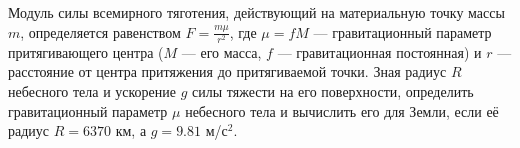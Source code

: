 Модуль силы всемирного тяготения, действующий на материальную точку
массы $m$, определяется равенством $F=\frac{m\mu}{r^2}$, где
$\mu=fM$ --- гравитационный параметр притягивающего центра ($M$ --- его
масса, $f$ --- гравитационная постоянная) и $r$ --- расстояние от центра
притяжения до притягиваемой точки. Зная радиус $R$ небесного тела
и ускорение $g$ силы тяжести на его поверхности, определить
гравитационный параметр $\mu$ небесного тела и вычислить его
для Земли, если её радиус $R=6370$ км, а $g=9.81$ м/с$^2$.
